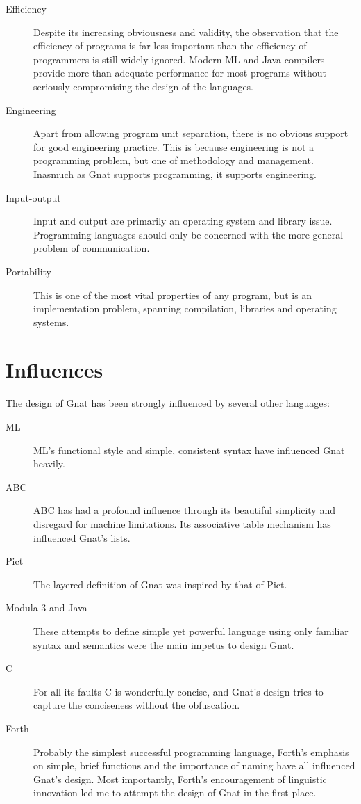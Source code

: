 \documentclass[english]{article}
\begin{document}
\begin{description}
\item[Efficiency]Despite its increasing obviousness and validity, the observation that the efficiency of programs is far less important than the efficiency of programmers is still widely ignored. Modern ML and Java compilers provide more than adequate performance for most programs without seriously compromising the design of the languages.
\item[Engineering]Apart from allowing program unit separation, there is no obvious support for good engineering practice. This is because engineering is not a programming problem, but one of methodology and management. Inasmuch as Gnat supports programming, it supports engineering.
\item[Input-output]Input and output are primarily an operating system and library issue. Programming languages should only be concerned with the more general problem of communication.
\item[Portability]This is one of the most vital properties of any program, but is an implementation problem, spanning compilation, libraries and operating systems.
\end{description}



\section{Influences}

The design of Gnat has been strongly influenced by several other languages:

\begin{description}
\item[ML]ML's functional style and simple, consistent syntax have influenced Gnat heavily.
\item[ABC]ABC has had a profound influence through its beautiful simplicity and disregard for machine limitations. Its associative table mechanism has influenced Gnat's lists.
\item[Pict]The layered definition of Gnat was inspired by that of Pict.
\item[Modula-3 and Java]These attempts to define simple yet powerful language using only familiar syntax and semantics were the main impetus to design Gnat.
\item[C]For all its faults C is wonderfully concise, and Gnat's design tries to capture the conciseness without the obfuscation.
\item[Forth]Probably the simplest successful programming language, Forth's emphasis on simple, brief functions and the importance of naming have all influenced Gnat's design. Most importantly, Forth's encouragement of linguistic innovation led me to attempt the design of Gnat in the first place.
\end{description}
\end{document}
